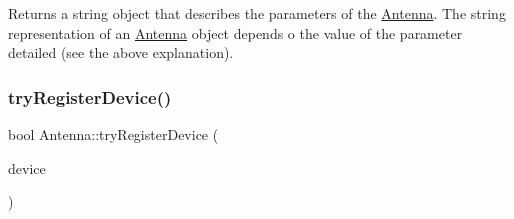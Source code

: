 \begin{DoxyReturn}{Returns}
a string object that describes the parameters of the \hyperlink{class_antenna}{Antenna}. The string representation of an \hyperlink{class_antenna}{Antenna} object depends o the value of the parameter {\ttfamily detailed} (see the above explanation). 
\end{DoxyReturn}
\mbox{\label{class_antenna_a4455f5c804e1ea520dd849dc9fd7b0b4}} 
\subsubsection{\texorpdfstring{try\+Register\+Device()}{tryRegisterDevice()}}
{\footnotesize\ttfamily bool Antenna\+::try\+Register\+Device (\begin{DoxyParamCaption}\item[{Holdable\+Agent $\ast$}]{device }\end{DoxyParamCaption})}

